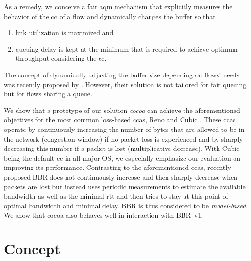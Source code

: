 \documentclass[sigconf, 10pt, letterpaper,dvipsnames\ifx\removeHeaders\tempYes ,nonacm\fi]{acmart}
\begin{document}
As a remedy, we conceive a fair \gls{aqm} mechanism that explicitly measures the behavior of the \gls{cc} of a flow and dynamically changes the buffer so that 
\begin{enumerate}[topsep=0pt,wide,labelwidth=!,labelindent=0pt]
\item link utilization is maximized and
\item queuing delay is kept at the minimum that is required to achieve optimum throughput considering the \gls{cc}.
\end{enumerate}
The concept of dynamically adjusting the buffer size depending on flows' needs was recently proposed by \cite{bless_policy-oriented_2018}. However, their solution is not tailored for fair queuing but for flows sharing a queue. 

We show that a prototype of our solution \textit{\gls{cocoa}} can achieve the aforementioned objectives for the most common loss-based \glspl{cca}, Reno \cite {jacobson_congestion_1988} and Cubic \cite{ha_cubic:_2008}. These \glspl{cca} operate by continuously increasing the number of bytes that are allowed to be in the network (congestion window) if no packet loss is experienced and by sharply decreasing this number if a packet is lost (multiplicative decrease). With Cubic being the default \gls{cc} in all major OS, we especially emphasize our evaluation on improving its performance. Contrasting to the aforementioned \glspl{cca}, recently proposed BBR \cite{cardwell_bbr:_2016} does not continuously increase and then sharply decrease when packets are lost but instead uses periodic measurements to estimate the available bandwidth as well as the minimal \gls{rtt} and then tries to stay at this point of optimal bandwidth and minimal delay. BBR is thus considered to be \textit{model-based}. We show that \gls{cocoa} also behaves well in interaction with BBR~v1.

\section{Concept}
\end{document}
